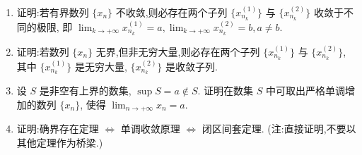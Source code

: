 \begin{enumerate}
    \item[8.]证明:若有界数列 $\{x_{n}\}$ 不收敛,则必存在两个子列 $\displaystyle\{x_{n_{k}}^{(1)}\}$ 与 $\{x_{n_{k}}^{(2)}\}$ 收敛于不同的极限,
    即 $\displaystyle\lim_{k\to +\infty}x_{n_{k}}^{(1)} = a, \lim_{k\to +\infty}x_{n_{k}}^{(2)} = b, a\neq b.$

    \item[9.]证明:若数列 $\{x_{n}\}$ 无界,但非无穷大量,则必存在两个子列 $\displaystyle\{x_{n_{k}}^{(1)}\}$ 与 $\displaystyle\{x_{n_{k}}^{(2)}\}$,
    其中 $\displaystyle\{x_{n_{k}}^{(1)}\}$ 是无穷大量, $\displaystyle\{x_{n_{k}}^{(2)}\}$ 是收敛子列.

    \item[10.]设 $S$ 是非空有上界的数集, $\sup S = a\notin S$. 证明在数集 $S$ 中可取出严格单调增加的数列 $\{x_{n}\}$,
    使得 $\displaystyle\lim_{n\to +\infty}x_{n} = a$.

    \item[11.]证明:确界存在定理 $\Leftrightarrow$ 单调收敛原理 $\Leftrightarrow$ 闭区间套定理. (注:直接证明,不要以其他定理作为桥梁.)


\end{enumerate}
